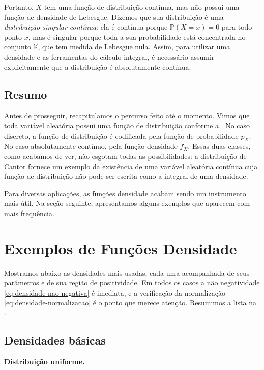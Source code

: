 \documentclass[12pt,portuguese]{article}
\theoremstyle{definition}
\theoremstyle{plainexercise}
\theoremstyle{starredexercise}
\theoremstyle{definition}
\begin{document}
Portanto, $X$ tem uma função de distribuição contínua, mas não possui uma
função de densidade de Lebesgue. Dizemos que sua distribuição é uma
\emph{distribuição singular contínua}: ela é contínua porque
$\mathbb{P}(X=x)=0$ para todo ponto $x$, mas é singular porque toda a sua
probabilidade está concentrada no conjunto $\mathbb{K}$, que tem medida de
Lebesgue nula. Assim, para utilizar uma densidade e as ferramentas do cálculo
integral, é necessário assumir explicitamente que a distribuição é
absolutamente contínua.

\subsection{Resumo}

Antes de prosseguir, recapitulamos o percurso feito até o momento. 
Vimos que toda variável aleatória possui uma função
de distribuição conforme a . No caso discreto,
a função de distribuição é codificada pela função de probabilidade $p_X$. 
No caso absolutamente contínuo, pela função densidade $f_X$. Essas duas classes, como
acabamos de ver, não esgotam todas as possibilidades: a distribuição de Cantor 
fornece um exemplo da existência de uma variável aleatória
contínua cuja função de distribuição não pode 
ser escrita como a integral de uma densidade.

Para diversas aplicações, as funções densidade acabam sendo um instrumento mais útil. 
Na seção seguinte, apresentamos alguns exemplos que aparecem com mais frequência.

\section{Exemplos de Funções Densidade}
\label{sec:densidades-usuais}

Mostramos abaixo as densidades mais usadas, cada uma acompanhada de seus
parâmetros e de sua região de positividade. Em todos os casos a não negatividade
\eqref{eq:densidade-nao-negativa} é imediata, e a verificação da
normalização \eqref{eq:densidade-normalizacao} é o ponto que merece atenção.
Resumimos a lista na .

\subsection{Densidades básicas}

\medskip
\noindent\textbf{Distribuição uniforme.}
\end{document}
